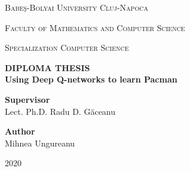 \documentclass[12pt,twoside]{report}
\newcommand\blankpage{%
    \null
    \thispagestyle{empty}%
    \addtocounter{page}{-1}%
    \newpage}
\begin{document}
\begin{titlepage}
    \center %

    {\scshape\LARGE Babeş-Bolyai University Cluj-Napoca \par}
    \vspace{0.125cm}
    {\scshape\LARGE Faculty of Mathematics and Computer Science\par}
    \vspace{0.125cm}
    {\scshape\LARGE Specialization Computer Science\par}
    \vspace{5cm}

    {
        \bfseries
        \LARGE \uppercase{Diploma Thesis} \\[1.5cm]
        \huge Using Deep Q-networks to learn Pacman
    }\\[4cm]

    \begin{flushleft}
        \Large
            \textbf{Supervisor}
            \vspace{0.2cm}\\
        \Large
            Lect. Ph.D. Radu D. Găceanu
            \vspace{0.125cm}\\
    \end{flushleft}

    \begin{flushright}
        \Large
            \textbf{Author}
            \vspace{0.2cm}\\
        \Large
            Mihnea Ungureanu
    \end{flushright}

    \vfill

    {\center \large 2020}
\end{titlepage}

\blankpage
\end{document}
